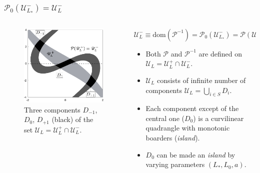 \documentclass [10pt] {beamer}
\begin{document}
\begin{frame}
	\frametitle{$\mathcal{P}_0(\mathscr{U}_{L_*}^-) = \mathscr{U}_L^-$}
	\begin{columns}[T]
		\begin{column}{.5\textwidth}
			\begin{figure}
			\includegraphics[width = 1\textwidth]{pic/h-strips-step-3.pdf}
			\caption{Three components $D_{-1}$, $D_0$, $D_{+1}$ (black) of the set $\mathscr{U}_L = \mathscr{U}_L^+ \cap \mathscr{U}_L^-$.}
			\label{pic:h-strips-step-3}
			\end{figure}
		\end{column}
		\begin{column}{.5\textwidth}
			\begin{equation*}
				\mathscr{U}_L^- \equiv \textrm{dom}(\mathcal{P}^{-1}) = \mathcal{P}_0 (\mathscr{U}_{L_*}^-) = \mathcal{P}(\mathscr{U}_L^-).
			\end{equation*}
			\begin{itemize}
				\item Both $\mathcal{P}$ and $\mathcal{P}^{-1}$ are defined on $\mathscr{U}_L = \mathscr{U}_L^+ \cap \mathscr{U}_L^-$. \\[10pt]
				\item $\mathscr{U}_L$ consists  of infinite number of components $\mathscr{U}_L = \bigcup_{i \in S} D_i$. \\[10pt]
				\item Each component except of the central one ($D_0$) is a curvilinear quadrangle with monotonic boarders ({\it island}). \\[10pt]
				\item $D_0$ can be made an {\it island} by varying parameters $(L_*, L_0, a)$.
			\end{itemize}
		\end{column}
	\end{columns}
\end{frame}
\end{document}
